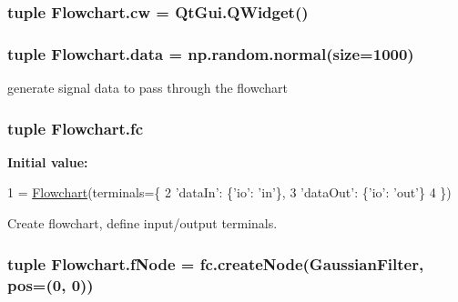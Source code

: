 \subsubsection[{cw}]{\setlength{\rightskip}{0pt plus 5cm}tuple Flowchart.\+cw = Qt\+Gui.\+Q\+Widget()}\label{namespaceFlowchart_a8c7765a75e5c267970b7a075876dd703}
\hypertarget{namespaceFlowchart_a7d5fda16f35dc91fa5fde9e7bb08e1e5}{}
\subsubsection[{data}]{\setlength{\rightskip}{0pt plus 5cm}tuple Flowchart.\+data = np.\+random.\+normal(size=1000)}\label{namespaceFlowchart_a7d5fda16f35dc91fa5fde9e7bb08e1e5}


generate signal data to pass through the flowchart 

\hypertarget{namespaceFlowchart_afcff929e4d9621e1fa7a72969e1e247e}{}
\subsubsection[{fc}]{\setlength{\rightskip}{0pt plus 5cm}tuple Flowchart.\+fc}\label{namespaceFlowchart_afcff929e4d9621e1fa7a72969e1e247e}
{\bfseries Initial value\+:}
\begin{DoxyCode}
1 = \hyperlink{classFlowchart_1_1Flowchart}{Flowchart}(terminals=\{
2         \textcolor{stringliteral}{'dataIn'}: \{\textcolor{stringliteral}{'io'}: \textcolor{stringliteral}{'in'}\},
3         \textcolor{stringliteral}{'dataOut'}: \{\textcolor{stringliteral}{'io'}: \textcolor{stringliteral}{'out'}\}    
4     \})
\end{DoxyCode}


Create flowchart, define input/output terminals. 

\hypertarget{namespaceFlowchart_aed61dc3e3102ab47e39b56d0318e82b1}{}
\subsubsection[{f\+Node}]{\setlength{\rightskip}{0pt plus 5cm}tuple Flowchart.\+f\+Node = fc.\+create\+Node(\textquotesingle{}Gaussian\+Filter\textquotesingle{}, pos=(0, 0))}\label{namespaceFlowchart_aed61dc3e3102ab47e39b56d0318e82b1}
\hypertarget{namespaceFlowchart_a7c65bdf9588d2e20126ed9915552be1d}{}

